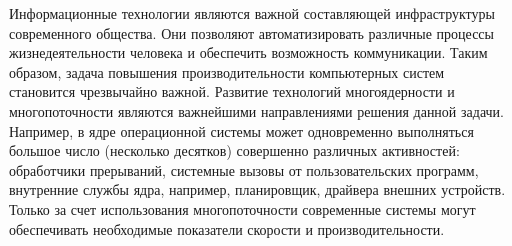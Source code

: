 
{\actuality} Информационные технологии являются важной составляющей инфраструктуры современного общества.
Они позволяют автоматизировать различные процессы жизнедеятельности человека и обеспечить возможность коммуникации.
Таким образом, задача повышения производительности компьютерных систем становится чрезвычайно важной.
Развитие технологий многоядерности и многопоточности являются важнейшими направлениями решения данной задачи.
Например, в ядре операционной системы может одновременно выполняться большое число (несколько десятков) совершенно различных активностей: обработчики прерываний, системные вызовы от пользовательских программ, внутренние службы ядра, например, планировщик, драйвера внешних устройств.
Только за счет использования многопоточности современные системы могут обеспечивать необходимые показатели скорости и производительности.
%


